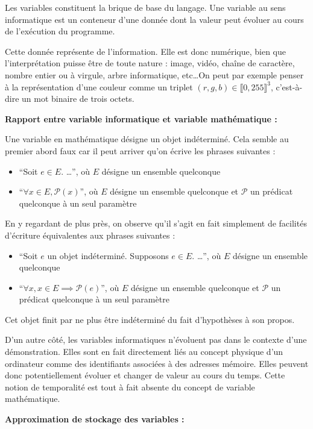 \documentclass[../../../main.tex]{subfiles}
\begin{document}
Les variables constituent la brique de base du langage. Une variable au sens informatique est un conteneur d'une donnée dont la valeur peut évoluer au cours de l'exécution du programme.
 
Cette donnée représente de l'information. Elle est donc numérique, bien que l'interprétation puisse être de toute nature : image, vidéo, chaîne de caractère, nombre entier ou à virgule, arbre informatique, etc\dots On peut par exemple penser à la représentation d'une couleur comme un triplet $(r, g, b)\in{\llbracket 0, 255\rrbracket^{3}}$, c'est-à-dire un mot binaire de trois octets.
 
\textbf{Rapport entre variable informatique et variable mathématique :}
 
Une variable en mathématique désigne un objet indéterminé. Cela semble au premier abord faux car il peut arriver qu'on écrive les phrases suivantes :
\begin{itemize}
	\item ``Soit $e\in{E}$. \dots'', où $E$ désigne un ensemble quelconque
	\item ``$\forall{x\in{E}}, \mathcal{P}(x)$'', où $E$ désigne un ensemble quelconque et $\mathcal{P}$ un prédicat quelconque à un seul paramètre
\end{itemize}
En y regardant de plus près, on observe qu'il s'agit en fait simplement de facilités d'écriture équivalentes aux phrases suivantes :
\begin{itemize}
	\item ``Soit $e$ un objet indéterminé. Supposons $e\in{E}$. \dots'', où $E$ désigne un ensemble quelconque
	\item ``$\forall{x}, x\in{E}\implies{\mathcal{P}(e)}$'', où $E$ désigne un ensemble quelconque et $\mathcal{P}$ un prédicat quelconque à un seul paramètre
\end{itemize}
Cet objet finit par ne plus être indéterminé du fait d'hypothèses à son propos.
 
D'un autre côté, les variables informatiques n'évoluent pas dans le contexte d'une démonstration. Elles sont en fait directement liés au concept physique d'un ordinateur comme des identifiants associées à des adresses mémoire. Elles peuvent donc potentiellement évoluer et changer de valeur au cours du temps. Cette notion de temporalité est tout à fait absente du concept de variable mathématique.
 
\textbf{Approximation de stockage des variables :}
 
\end{document}
